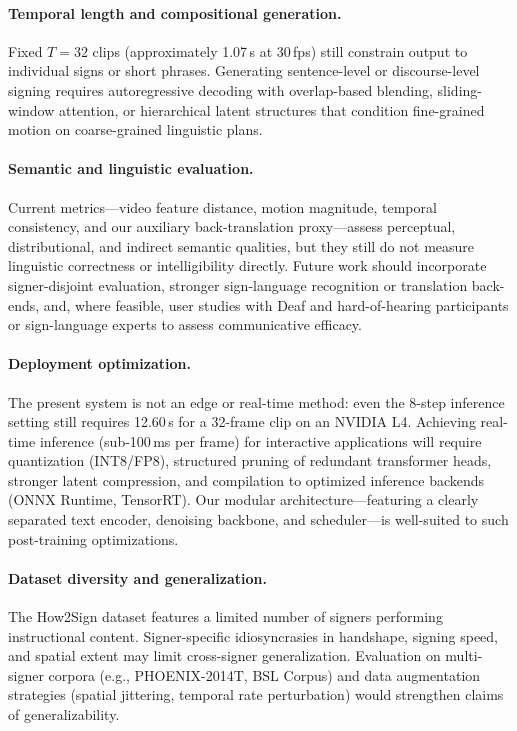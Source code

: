\documentclass{ieeeaccess}
\begin{document}
\paragraph{Temporal length and compositional generation.} Fixed $T=32$ clips (approximately 1.07\,s at 30\,fps) still constrain output to individual signs or short phrases. Generating sentence-level or discourse-level signing requires autoregressive decoding with overlap-based blending, sliding-window attention, or hierarchical latent structures that condition fine-grained motion on coarse-grained linguistic plans.

\paragraph{Semantic and linguistic evaluation.} Current metrics---video feature distance, motion magnitude, temporal consistency, and our auxiliary back-translation proxy---assess perceptual, distributional, and indirect semantic qualities, but they still do not measure linguistic correctness or intelligibility directly. Future work should incorporate signer-disjoint evaluation, stronger sign-language recognition or translation back-ends, and, where feasible, user studies with Deaf and hard-of-hearing participants or sign-language experts to assess communicative efficacy.

\paragraph{Deployment optimization.} The present system is not an edge or real-time method: even the 8-step inference setting still requires 12.60\,s for a 32-frame clip on an NVIDIA L4. Achieving real-time inference (sub-100\,ms per frame) for interactive applications will require quantization (INT8/FP8), structured pruning of redundant transformer heads, stronger latent compression, and compilation to optimized inference backends (ONNX Runtime, TensorRT). Our modular architecture---featuring a clearly separated text encoder, denoising backbone, and scheduler---is well-suited to such post-training optimizations.

\paragraph{Dataset diversity and generalization.} The How2Sign dataset features a limited number of signers performing instructional content. Signer-specific idiosyncrasies in handshape, signing speed, and spatial extent may limit cross-signer generalization. Evaluation on multi-signer corpora (e.g., PHOENIX-2014T, BSL Corpus) and data augmentation strategies (spatial jittering, temporal rate perturbation) would strengthen claims of generalizability.
\end{document}
